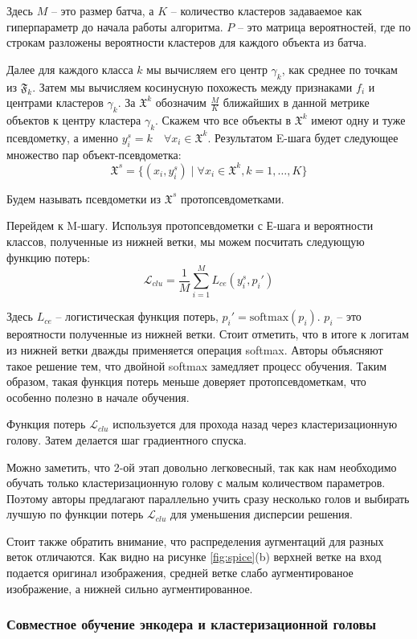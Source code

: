 \documentclass[a4paper,12pt]{extarticle}
\begin{document}
Здесь $M$ -- это 
размер батча, а $K$ -- количество кластеров задаваемое как 
гиперпараметр до начала работы алгоритма. $P$ -- это матрица
вероятностей, где по строкам разложены вероятности кластеров 
для каждого объекта из батча.

Далее для 
каждого класса $k$ мы вычисляем его центр $\gamma_k$, 
как среднее по точкам из $\mathfrak{F}_k$. Затем 
мы вычисляем косинусную похожесть между признаками $f_i$ 
и центрами кластеров $\gamma_k$. За $\mathfrak{X}^k$ обозначим 
$\frac{M}{K}$ ближайших в данной метрике объектов к 
центру кластера $\gamma_k$. Скажем что все объекты 
в $\mathfrak{X}^k$ имеют одну и туже псевдометку, а именно 
$y_i^s=k\quad \forall x_i\in\mathfrak{X}^k$. Результатом 
E-шага будет следующее множество пар объект-псевдометка:
\[
	\mathfrak{X}^s=\{(x_i, y_i^s)\mid \forall x_i 
	\in \mathfrak{X}^k, k=1,\ldots, K \}
\]

Будем называть псевдометки из $\mathfrak{X}^s$ протопсевдометками.

Перейдем к M-шагу. Используя протопсевдометки с Е-шага и вероятности 
классов, полученные из нижней ветки, мы можем посчитать следующую функцию 
потерь:
\[
	\mathcal{L}_{clu}=\frac{1}{M}\sum_{i=1}^M L_{ce}(y_i^s, p_i')
\]

Здесь $L_{ce}$ -- логистическая функция потерь, $p_i'=\text{softmax}(p_i)$. 
$p_i$ -- это вероятности полученные из нижней ветки. Стоит отметить, что в итоге к 
логитам из нижней ветки дважды применяется операция softmax. Авторы 
объясняют такое решение тем, что двойной softmax замедляет процесс обучения. 
Таким образом, такая функция потерь меньше доверяет протопсевдометкам, 
что особенно полезно в начале обучения. 

Функция потерь $\mathcal{L}_{clu}$ используется для прохода назад 
через кластеризационную голову. Затем делается шаг градиентного спуска.

Можно заметить, что 2-ой этап довольно легковесный, так как нам необходимо 
обучать только кластеризационную голову с малым количеством параметров. 
Поэтому авторы предлагают параллельно учить сразу несколько голов и выбирать
лучшую по функции потерь $\mathcal{L}_{clu}$ для уменьшения дисперсии решения.

Стоит также обратить внимание, что распределения аугментаций 
для разных веток отличаются. Как видно на рисунке \ref{fig:spice}(b) 
верхней ветке на вход подается оригинал изображения, средней ветке
слабо аугментированое изображение, а нижней сильно аугментированное.

\subsubsection{Совместное обучение энкодера и кластеризационной головы}
\end{document}

